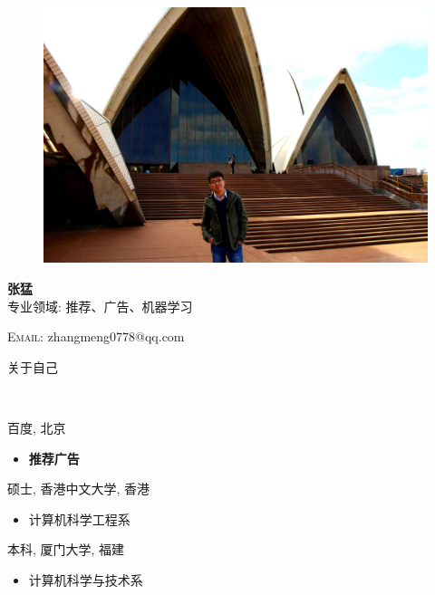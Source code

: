 \documentclass[20pt,a4paper]{article}
\newenvironment{changemargin}[2]{%
  \begin{list}{}{%
    \setlength{\topsep}{0pt}%
    \setlength{\leftmargin}{#1}%
    \setlength{\rightmargin}{#2}%
    \setlength{\listparindent}{\parindent}%
    \setlength{\itemindent}{\parindent}%
    \setlength{\parsep}{\parskip}%
  }%
  \item[]}{\end{list}
}
\newcommand{\lineover}{
	\begin{changemargin}{-0.05in}{-0.05in}
		\vspace*{-8pt}
		\hrulefill \\
		\vspace*{-2pt}
	\end{changemargin}
}
\newcommand{\header}[1]{
	\begin{changemargin}{-0.5in}{-0.5in}
		\scshape{#1}\\
  	\lineover
	\end{changemargin}
}
\newcommand{\contact}[4]{
	\begin{changemargin}{-0.5in}{-0.5in}
		\begin{center}
			{\large \scshape {#1}}\\ %
			{#2}\\ %
			{#3}\\ %
			{#4}%
		\end{center}
	\end{changemargin}
}
\newenvironment{body} {
	\vspace*{-16pt}
	\begin{changemargin}{-0.25in}{-0.5in}
  }	
	{\end{changemargin}
}
\begin{document}
\begin{figure}[t]
	\includegraphics[scale=0.2]{./cover.jpeg}
\end{figure}
\begin{minipage}[t]{0.5\textwidth}
\textbf{张猛} \\
\hfill 专业领域: 推荐、广告、机器学习\\
\end{minipage}
%
\begin{minipage}[t]{0.48\textwidth}
\textsc{Email:} zhangmeng0778@qq.com \\
\end{minipage}

\header{关于自己}
\begin{body}
	\vspace{14pt}
	百度, 北京\\
	\begin{itemize}
		\item \textbf{推荐广告}  \hfill \emph{} \\
	\end{itemize}
	硕士, 香港中文大学, 香港\\
	\begin{itemize}    
    		\item 计算机科学工程系 \hfill \emph{} \\
	\end{itemize}
	本科, 厦门大学, 福建\\
	\begin{itemize}
		\item 计算机科学与技术系  \hfill \emph{} \\
	\end{itemize}
\end{body}
\end{document}
